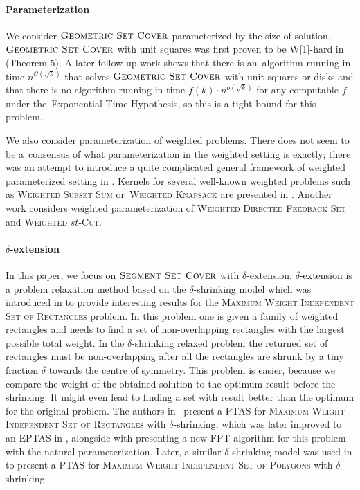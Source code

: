 \paragraph{Parameterization}
We consider $\textsc{Geometric Set Cover}$ 
parameterized by the size of solution.
$\textsc{Geometric Set Cover}$ with unit squares was first proven to be W[1]-hard 
in \cite{marx05} (Theorem 5). A later follow-up work \cite{voronoi}
shows that there is an~algorithm running in time $n^{\mathcal{O}(\sqrt{k})}$
that solves $\textsc{Geometric Set Cover}$ with unit squares or disks
and that there is no algorithm running in time $f(k) \cdot n^{o(\sqrt{k})}$
for any computable $f$ under the~Exponential-Time Hypothesis,
so this is a tight bound for this problem.

We also consider parameterization of weighted problems.
There does not seem to be a~consensus of what parameterization
in the weighted setting is exactly; there
was an attempt to introduce a quite complicated general
framework of weighted parameterized setting in \cite{weighted_framework}.
Kernels for several well-known weighted problems
such as \textsc{Weighted Subset Sum} or~\textsc{Weighted Knapsack} are presented in \cite{kernel_weighted}.
Another work \cite{weighted_flow} considers weighted
parameterization of \textsc{Weighted Directed Feedback Set} and \textsc{Weighted $st$-Cut}.

\paragraph{$\delta$-extension}
In this paper, we focus on $\textsc{Segment Set Cover}$ with $\delta$-extension.
$\delta$-extension is a problem relaxation method based on the
$\delta$-shrinking model which was introduced in \cite{shrinking_original}
to provide interesting results for
the \textsc{Maximum Weight Independent Set of Rectangles} problem.
In this problem one is given a family of weighted rectangles
and needs to find a set of non-overlapping rectangles
with the largest possible total weight.
In the $\delta$-shrinking relaxed problem
the returned set of rectangles must be non-overlapping
after all the rectangles are shrunk by a tiny fraction $\delta$
towards the centre of symmetry.
This problem is easier, because we compare the
weight of the obtained solution
to the optimum result before the shrinking. It might
even lead to finding a set with result better than the optimum
for the original problem.
The authors in~\cite{shrinking_original} present a PTAS
for \textsc{Maximum Weight Independent Set of Rectangles} with $\delta$-shrinking,
which was later improved to an EPTAS in \cite{shrinking1}, alongside
with presenting a new FPT algorithm
for this problem with the natural parameterization.
Later, a similar $\delta$-shrinking model was used in \cite{shrinking2}
to present a PTAS for
\textsc{Maximum Weight Independent Set of Polygons} with $\delta$-shrinking.

